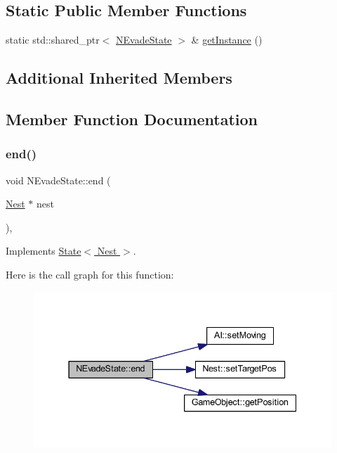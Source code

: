 \subsection*{Static Public Member Functions}
\begin{DoxyCompactItemize}
\item 
static std\+::shared\+\_\+ptr$<$ \hyperlink{class_n_evade_state}{N\+Evade\+State} $>$ \& \hyperlink{class_n_evade_state_add77aa83f13befae11a53a89f3c0ea13}{get\+Instance} ()
\end{DoxyCompactItemize}
\subsection*{Additional Inherited Members}


\subsection{Member Function Documentation}
\mbox{\label{class_n_evade_state_a2bdb23a457b6ef01dee943c0c26da079}} 
\subsubsection{\texorpdfstring{end()}{end()}}
{\footnotesize\ttfamily void N\+Evade\+State\+::end (\begin{DoxyParamCaption}\item[{\hyperlink{class_nest}{Nest} $\ast$}]{nest }\end{DoxyParamCaption})\hspace{0.3cm}{\ttfamily [override]}, {\ttfamily [virtual]}}



Implements \hyperlink{class_state_a97d058722f988c008e912a0e5ec879b3}{State$<$ Nest $>$}.

Here is the call graph for this function\+:
\nopagebreak
\begin{figure}[H]
\begin{center}
\leavevmode
\includegraphics[width=337pt]{class_n_evade_state_a2bdb23a457b6ef01dee943c0c26da079_cgraph}
\end{center}
\end{figure}
\mbox{\label{class_n_evade_state_add77aa83f13befae11a53a89f3c0ea13}} 
